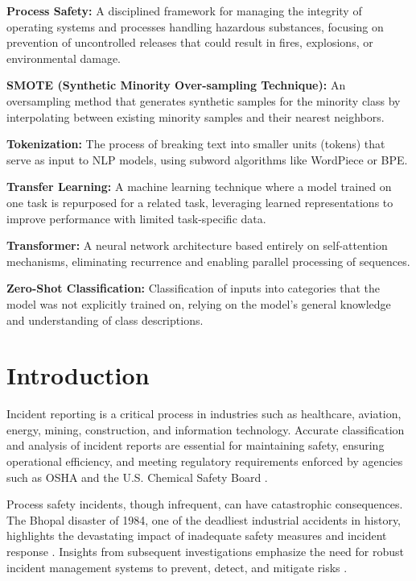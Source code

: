 \documentclass[11pt, titlepage, bibliography=totoc]{scrreprt}
\begin{document}
\textbf{Process Safety:} A disciplined framework for managing the integrity of operating systems and processes handling hazardous substances, focusing on prevention of uncontrolled releases that could result in fires, explosions, or environmental damage.

\textbf{SMOTE (Synthetic Minority Over-sampling Technique):} An oversampling method that generates synthetic samples for the minority class by interpolating between existing minority samples and their nearest neighbors.

\textbf{Tokenization:} The process of breaking text into smaller units (tokens) that serve as input to NLP models, using subword algorithms like WordPiece or BPE.

\textbf{Transfer Learning:} A machine learning technique where a model trained on one task is repurposed for a related task, leveraging learned representations to improve performance with limited task-specific data.

\textbf{Transformer:} A neural network architecture based entirely on self-attention mechanisms, eliminating recurrence and enabling parallel processing of sequences.

\textbf{Zero-Shot Classification:} Classification of inputs into categories that the model was not explicitly trained on, relying on the model's general knowledge and understanding of class descriptions.

\cleardoublepage

\chapter{Introduction}

Incident reporting is a critical process in industries such as healthcare, aviation, energy, mining, construction, and information technology. Accurate classification and analysis of incident reports are essential for maintaining safety, ensuring operational efficiency, and meeting regulatory requirements enforced by agencies such as OSHA and the U.S. Chemical Safety Board \cite{1_Baybutt}.

Process safety incidents, though infrequent, can have catastrophic consequences. The Bhopal disaster of 1984, one of the deadliest industrial accidents in history, highlights the devastating impact of inadequate safety measures and incident response \cite{2_Broughton}. Insights from subsequent investigations emphasize the need for robust incident management systems to prevent, detect, and mitigate risks \cite{Stefana2024}.
\end{document}
